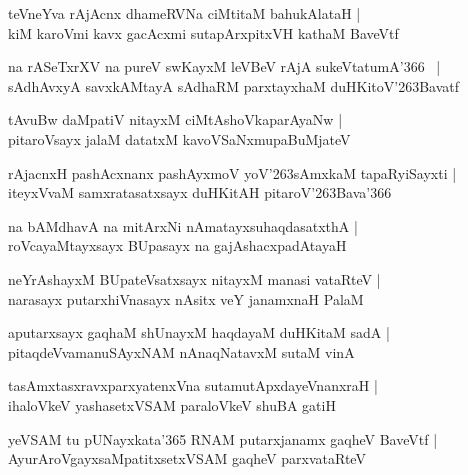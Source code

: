\documentclass[twoside,12pt,openright]{book}
\def\S{\char'263}
\newcounter{shloka}[chapter]
\begin{document}
\begin{shloka}%
teVneYva rAjAcnx dhameRVNa ciMtitaM bahukAlataH |\\
kiM karoVmi kavx gacAcxmi sutapArxpitxVH kathaM BaveVtf
\end{shloka}

\begin{shloka}%
na rASeTxrXV na pureV swKayxM leVBeV rAjA sukeVtatumA\char'366 ~|\\
sAdhAvxyA savxkAMtayA sAdhaRM parxtayxhaM duHKitoV\S Bavatf
\end{shloka}

\begin{shloka}%
tAvuBw daMpatiV nitayxM ciMtAshoVkaparAyaNw |\\
pitaroVsayx jalaM datatxM kavoVSaNxmupaBuMjateV 
\end{shloka}

\begin{shloka}%
rAjacnxH pashAcxnanx pashAyxmoV yoV\S sAmxkaM tapaRyiSayxti |\\
iteyxVvaM samxratasatxsayx duHKitAH pitaroV\S Bava\char'366
\end{shloka}

\begin{shloka}%
na bAMdhavA na mitArxNi nAmatayxsuhaqdasatxthA |\\
roVcayaMtayxsayx BUpasayx na gajAshacxpadAtayaH
\end{shloka}

\begin{shloka}%
neYrAshayxM BUpateVsatxsayx nitayxM manasi vataRteV |\\
narasayx putarxhiVnasayx nAsitx veY janamxnaH PalaM
\end{shloka}

\begin{shloka}%
aputarxsayx gaqhaM shUnayxM haqdayaM duHKitaM sadA |\\
pitaqdeVvamanuSAyxNAM nAnaqNatavxM sutaM vinA 
\end{shloka}

\begin{shloka}%
tasAmxtasxravxparxyatenxVna sutamutApxdayeVnanxraH |\\
ihaloVkeV yashasetxVSAM paraloVkeV shuBA gatiH
\end{shloka}

\begin{shloka}%
yeVSAM tu pUNayxkata\char'365 RNAM putarxjanamx gaqheV BaveVtf |\\
AyurAroVgayxsaMpatitxsetxVSAM gaqheV parxvataRteV
\end{shloka}
\end{document}
